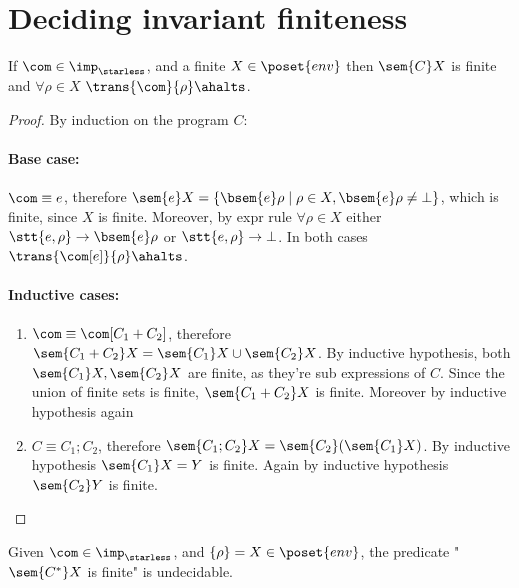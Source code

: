 \section{Deciding invariant finiteness}

\begin{lemma}\label{le:finiteness}
  If \(\com\in\imp_\starless\), and a finite \(X \in \poset{env}\)
  then \(\sem{C}X\) is finite and \(\forall \rho \in X\) 
  \(\trans{\com}{\rho}\ahalts\).
\end{lemma}

\begin{proof}
  By induction on the program \(C\):
  \paragraph*{Base case:\\}
  \(\com \equiv e\), therefore \(\sem{e}X = \{\bsem{e}\rho \mid \rho
  \in X , \bsem{e}\rho \neq \bot\}\), which is finite, since \(X\) is
  finite. Moreover, by expr rule \(\forall \rho \in X\) either
  \(\stt{e,\rho} \to \bsem{e}\rho\) or \(\stt{e,\rho} \to \bot\). In
  both cases \(\trans{\com[e]}{\rho} \ahalts\).
  
  \paragraph*{Inductive cases:\\}
  \begin{enumerate}
  \item \(\com\equiv \com[C_1 + C_2]\), therefore \(\sem{C_1 + C_2} X
    = \sem{C_1}X \cup \sem{C_2}X\). By inductive hypothesis, both
    \(\sem{C_1}X, \sem{C_2}X\) are finite, as they're sub expressions
    of \(C\). Since the union of finite sets is finite, \(\sem{C_1 +
      C_2}X\) is finite. Moreover by inductive hypothesis again
  \item \(C\equiv C_1; C_2\), therefore \(\sem{C_1;C_2}X =
    \sem{C_2}(\sem{C_1}X)\). By inductive hypothesis \(\sem{C_1}X =
    Y\) is finite. Again by inductive hypothesis \(\sem{C_2}Y\) is
    finite.
  \end{enumerate}
\end{proof}

\begin{lemma}\label{le:infiniteness}
  Given \(\com\in\imp_\starless\), and \(\{\rho\} = X \in
  \poset{env}\), the predicate "\(\sem{C^*}X\) is finite" is
  undecidable.
\end{lemma}

